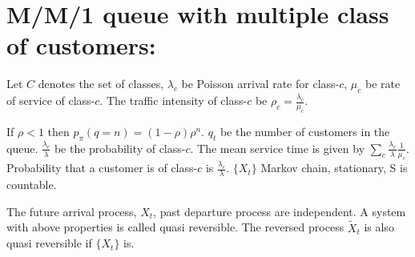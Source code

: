 \documentclass[all-lectures.tex]{subfiles}
\begin{document}

\setcounter{section}{4}
\setcounter{subsection}{1}

\section*{}
\section{M/M/1 queue with multiple class of customers:}
Let $C$ denotes the set of classes, $\lambda_c$ be Poisson arrival rate for class-$c$, $\mu_c$ be rate of service of class-$c$. The traffic intensity of class-$c$ be $\rho_c = \frac{\lambda_c}{\mu_c}$.

If $\rho < 1$ then $p_{\pi} (q=n) = (1-\rho) \rho^n$. $q_t$ be the number of customers in the queue. $\frac{\lambda_c}{\lambda}$ be the probability of class-$c$. The mean service time is given by $\sum_c \frac{\lambda_c}{\lambda} \frac{1}{\mu_c}$. Probability that a customer is of class-$c$ is $\frac{\lambda_c}{\lambda}$.
$\{X_t\}$ Markov chain, stationary, S is countable.

The future arrival process, $X_t$, past departure process are independent.
A system with above properties is called quasi reversible.
The reversed process $\tilde{X}_t$ is also quasi reversible if $\{X_t\}$ is.
\end{document}
